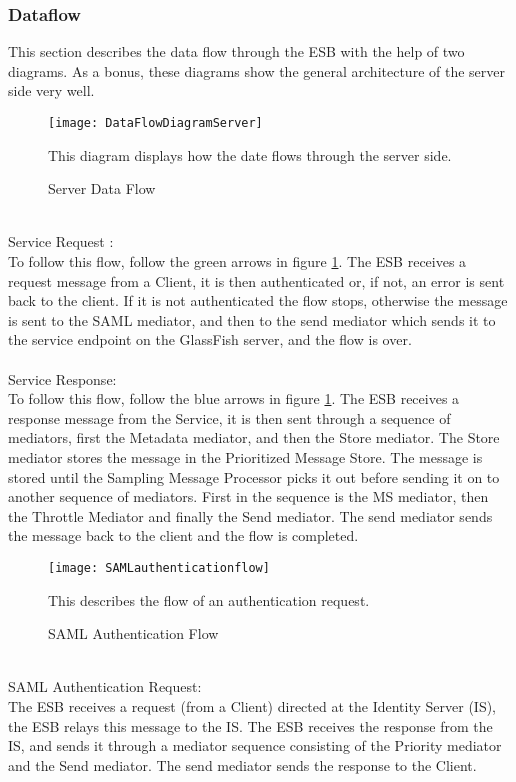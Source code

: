     \subsubsection{Dataflow}\label{Textual Server Dataflow} 
        This section describes the data flow through the ESB with the help of two diagrams. As a bonus, these diagrams show the general architecture of the server side very well.
\\
        \begin{figure}[h]
            \centering
            \texttt{[image: DataFlowDiagramServer]}
            \caption{Server Data Flow}
            This diagram displays how the date flows through the server side. 
            \label{fig:DataFlowDiagramServer}
        \end{figure}
\\
Service Request :\\
To follow this flow, follow the green arrows in figure \ref{fig:DataFlowDiagramServer}. The ESB receives a request message from a Client, it is then authenticated or, if not, an error is sent back to the client. If it is not authenticated the flow stops, otherwise the message is sent to the SAML mediator, and then to the send mediator which sends it to the service endpoint on the GlassFish server, and the flow is over.
\\\\
Service Response:\\
To follow this flow, follow the blue arrows in figure \ref{fig:DataFlowDiagramServer}. The ESB receives a response message from the Service, it is then sent through a sequence of mediators, first the Metadata mediator, and then  the Store mediator. The Store mediator stores the message in the Prioritized Message Store. The message is stored until the Sampling Message Processor picks it out before sending it on to another sequence of mediators. First in the sequence is the MS mediator, then the Throttle Mediator and finally the Send mediator. The send mediator sends the message back to the client and the flow is completed.
\\
    \begin{figure}[h]
        \centering
        \texttt{[image: SAMLauthenticationflow]}
        \caption{SAML Authentication Flow}
        This describes the flow of an authentication request. 
        \label{fig:SAMLauthenticationflow}
    \end{figure}
\\           
SAML Authentication Request:\\
The ESB receives a request (from a Client) directed at the Identity Server (IS), the ESB relays this message to the IS. The ESB receives the response from the IS, and sends it through a mediator sequence consisting of the Priority mediator and the Send mediator. The send mediator sends the response to the Client.

